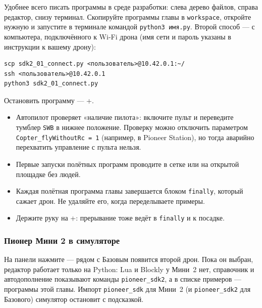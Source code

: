 Удобнее всего писать программы в среде разработки: слева дерево файлов, справа редактор, снизу терминал. Скопируйте программы главы в \texttt{workspace}, откройте нужную и запустите в терминале командой \verb|python3 имя.py|. Второй способ --- с компьютера, подключённого к Wi-Fi дрона (имя сети и пароль указаны в инструкции к вашему дрону):

\begin{codebox}
\begin{verbatim}
scp sdk2_01_connect.py <пользователь>@10.42.0.1:~/
ssh <пользователь>@10.42.0.1
python3 sdk2_01_connect.py
\end{verbatim}
\end{codebox}

Остановить программу --- +.

\begin{warnbox}
\begin{itemize}
    \item Автопилот проверяет «наличие пилота»: включите пульт и переведите тумблер \texttt{SWB} в нижнее положение. Проверку можно отключить параметром \texttt{Copter\_flyWithoutRc = 1} (например, в Pioneer Station), но тогда аварийно перехватить управление с пульта нельзя.
    \item Первые запуски полётных программ проводите в сетке или на открытой площадке без людей.
    \item Каждая полётная программа главы завершается блоком \verb|finally|, который сажает дрон. Не удаляйте его, когда переделываете примеры.
    \item Держите руку на +: прерывание тоже ведёт в \verb|finally| и к посадке.
\end{itemize}
\end{warnbox}

\subsubsection*{Пионер Мини 2 в симуляторе}

На панели  нажмите  --- рядом с Базовым появится второй дрон. Пока он выбран, редактор работает только на Python: Lua и Blockly у Мини~2 нет, справочник и автодополнение показывают команды \texttt{pioneer\_sdk2}, а в списке примеров --- программы этой главы. Импорт \texttt{pioneer\_sdk} для Мини~2 (и \texttt{pioneer\_sdk2} для Базового) симулятор остановит с подсказкой.


